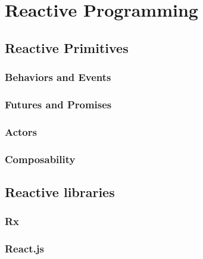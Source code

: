 \chapter{Reactive Programming}

\section{Reactive Primitives}

\subsection{Behaviors and Events}

\subsection{Futures and Promises}

\subsection{Actors}

\subsection{Composability}

\section{Reactive libraries}

\subsection{Rx}

\subsection{React.js}